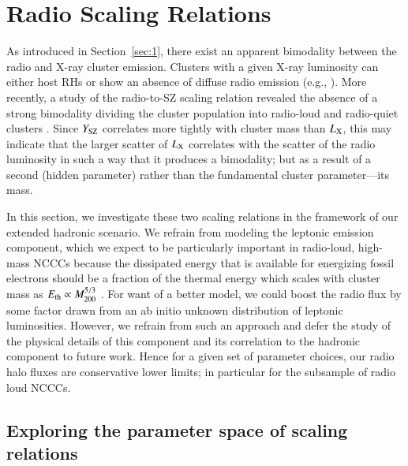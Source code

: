 \documentclass[useAMS,usenatbib]{mn2e}
\begin{document}
\section{Radio Scaling Relations}
\label{sec:4}
As introduced in Section~\ref{sec:1}, there exist an apparent bimodality between
the radio and X-ray cluster emission. Clusters with a given X-ray luminosity can
either host RHs or show an absence of diffuse radio emission (e.g.,
\citealp{2009A&A...507..661B,2011A&A...527A..99E}). More recently, a study of
the radio-to-SZ scaling relation revealed the absence of a strong bimodality
dividing the cluster population into radio-loud and radio-quiet clusters
\citep{2012MNRAS.421L.112B}. Since $Y_{{\mathrm{SZ}}}$ correlates more tightly with
cluster mass than $L_{{\mathrm{X}}}$, this may indicate that the larger scatter of
$L_{{\mathrm{X}}}$ correlates with the scatter of the radio luminosity in such a way
that it produces a bimodality; but as a result of a second (hidden parameter)
rather than the fundamental cluster parameter---its mass. 

In this section, we investigate these two scaling relations in the framework of
our extended hadronic scenario. We refrain from modeling the leptonic emission
component, which we expect to be particularly important in radio-loud, high-mass
NCCCs because the dissipated energy that is available for energizing fossil
electrons should be a fraction of the thermal energy which scales with cluster
mass as $E_{\mathrm{th}}\propto M_{200}^{5/3}$ \citep[][for magneto-turbulent
reacceleration models]{2005MNRAS.357.1313C}. For want of a better model, we
could boost the radio flux by some factor drawn from an ab initio unknown
distribution of leptonic luminosities. However, we refrain from such an approach
and defer the study of the physical details of this component and its
correlation to the hadronic component to future work. Hence for a given set of
parameter choices, our radio halo fluxes are conservative lower limits; in
particular for the subsample of radio loud NCCCs.


\subsection{Exploring the parameter space of scaling relations}
\end{document}
